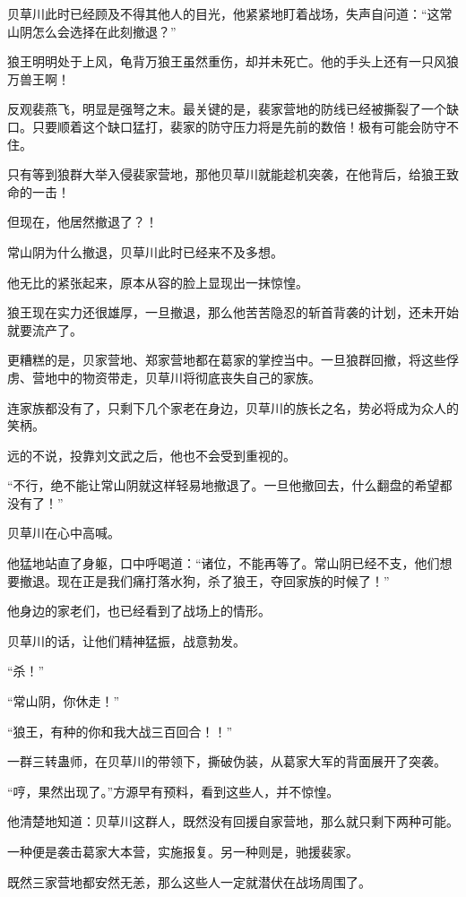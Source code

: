\begin{this_body}
贝草川此时已经顾及不得其他人的目光，他紧紧地盯着战场，失声自问道：“这常山阴怎么会选择在此刻撤退？”

狼王明明处于上风，龟背万狼王虽然重伤，却并未死亡。他的手头上还有一只风狼万兽王啊！

反观裴燕飞，明显是强弩之末。最关键的是，裴家营地的防线已经被撕裂了一个缺口。只要顺着这个缺口猛打，裴家的防守压力将是先前的数倍！极有可能会防守不住。

只有等到狼群大举入侵裴家营地，那他贝草川就能趁机突袭，在他背后，给狼王致命的一击！

但现在，他居然撤退了？！

常山阴为什么撤退，贝草川此时已经来不及多想。

他无比的紧张起来，原本从容的脸上显现出一抹惊惶。

狼王现在实力还很雄厚，一旦撤退，那么他苦苦隐忍的斩首背袭的计划，还未开始就要流产了。

更糟糕的是，贝家营地、郑家营地都在葛家的掌控当中。一旦狼群回撤，将这些俘虏、营地中的物资带走，贝草川将彻底丧失自己的家族。

连家族都没有了，只剩下几个家老在身边，贝草川的族长之名，势必将成为众人的笑柄。

远的不说，投靠刘文武之后，他也不会受到重视的。

“不行，绝不能让常山阴就这样轻易地撤退了。一旦他撤回去，什么翻盘的希望都没有了！”

贝草川在心中高喊。

他猛地站直了身躯，口中呼喝道：“诸位，不能再等了。常山阴已经不支，他们想要撤退。现在正是我们痛打落水狗，杀了狼王，夺回家族的时候了！”

他身边的家老们，也已经看到了战场上的情形。

贝草川的话，让他们精神猛振，战意勃发。

“杀！”

“常山阴，你休走！”

“狼王，有种的你和我大战三百回合！！”

一群三转蛊师，在贝草川的带领下，撕破伪装，从葛家大军的背面展开了突袭。

“哼，果然出现了。”方源早有预料，看到这些人，并不惊惶。

他清楚地知道：贝草川这群人，既然没有回援自家营地，那么就只剩下两种可能。

一种便是袭击葛家大本营，实施报复。另一种则是，驰援裴家。

既然三家营地都安然无恙，那么这些人一定就潜伏在战场周围了。


\end{this_body}
